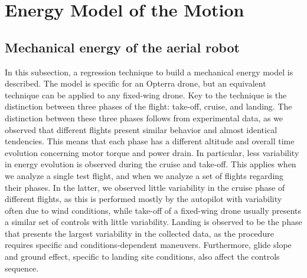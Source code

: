 \section{\color{cyan}Energy Model of the Motion}


\subsection{\color{cyan}Mechanical energy of the aerial robot}

In this subsection, a regression technique to build a mechanical energy model is described. The model is specific for an Opterra drone, but an equivalent technique can be applied to any fixed-wing drone. Key to the technique is the distinction between three phases of the flight: take-off, cruise, and landing. The distinction between these three phases follows from experimental data, as we observed that different flights present similar behavior and almost identical tendencies. This means that each phase has a different altitude and overall time evolution concerning motor torque and power drain. In particular, less variability in energy evolution is observed during the cruise and take-off. This applies when we analyze a single test flight, and when we analyze a set of flights regarding their phases. In the latter, we observed little variability in the cruise phase of different flights, as this is performed mostly by the autopilot with variability often due to wind conditions, while take-off of a fixed-wing drone usually presents a similar set of controls with little variability. Landing is observed to be the phase that presents the largest variability in the collected data, as the procedure requires specific and conditions-dependent maneuvers. Furthermore, glide slope and ground effect, specific to landing site conditions, also affect the controls sequence.

